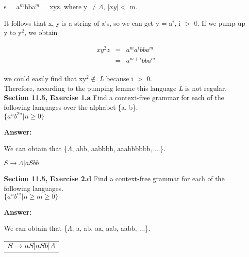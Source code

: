 \documentclass[12pt]{article}
\begin{document}
\begin{center}
s = a$^m$bba$^m$ = xyz, where y $\neq \Lambda$, $|xy| <$ m.   
\end{center}

It follows that x, y is a string of a's, so we can get y = a$^i$, i $>$ 0. If we pump up y to y$^2$, we obtain 

\begin{center}
\begin{eqnarray*}
xy^2z & = & a^ma^ibba^m \\
      & = & a^{m+i}bba^m \\
\end{eqnarray*}
\end{center}

we could easily find that xy$^2 \notin$ \textit{L} because i $>$ 0.\\
Therefore, according to the pumping lemme this language \textit{L} is not regular. \\ 

\textbf{Section 11.5, Exercise 1.a} Find a context-free grammar for each of the following 
languages over the alphabet \{a, b\}.\\

$\{a^nb^{2n} | n \geq 0\}$

\textbf{Answer:}

We can obtain that \{$\Lambda$, abb, aabbbb, aaabbbbbb, ...\}. \\

\begin{center}
$ S \rightarrow \Lambda| aSbb$ \\   
\end{center}

\textbf{Section 11.5, Exercise 2.d}  Find a context-free grammar for each of the following languages. \\
 $\{a^nb^m | n \geq m \geq 0\}$
 
\textbf{Answer:}

We can obtain that \{$\Lambda$, a, ab, aa, aab, aabb, ...\}. \\

\begin{center}
\begin{tabular}{l}
$S \rightarrow aS|aSb|\Lambda$ \\
\end{tabular}
\end{center}
\end{document}
